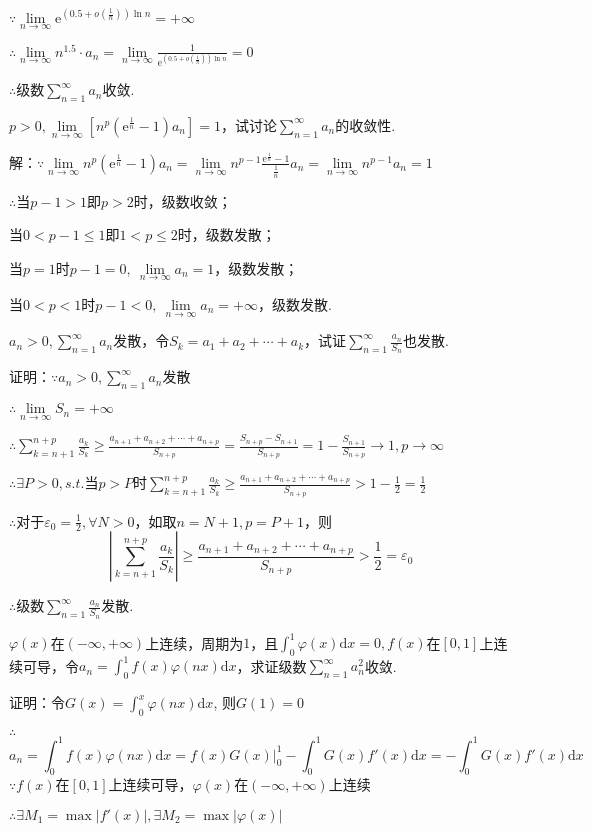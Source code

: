 \documentclass[12pt,UTF8]{ctexart}
\newcommand\Lim[0]{\lim\limits_{n\rightarrow\infty}}
\newcommand\Ser[1]{\sum_{n=#1}^\infty}
\newcommand{\varSer}[3]{\sum_{#1=#2}^{#3}}
\newcommand{\me}[0]{\mathrm e}
\begin{document}
\begin{enumerate}
$\because\Lim\me^{(0.5+o(\frac1{n}))\ln n}=+\infty$

$\therefore\Lim n^{1.5}\cdot a_n=\Lim\frac1{\me^{(0.5+o(\frac1{n}))\ln n}}=0$

$\therefore$级数$\Ser1{a_n}$收敛.

$p>0,\Lim[n^p(\mathrm e^{\frac1n}-1)a_n]=1$，试讨论$\Ser{1}a_n$的收敛性.

解：$\because\Lim n^p(\mathrm e^{\frac1n}-1)a_n=\Lim n^{p-1}\frac{\mathrm e^{\frac1n}-1}{\frac1n}a_n=\Lim n^{p-1}a_n=1$

$\therefore$当$p-1>1$即$p>2$时，级数收敛；

当$0<p-1\leq1$即$1<p\leq2$时，级数发散；

当$p=1$时$p-1=0,\ \Lim a_n=1$，级数发散；

当$0<p<1$时$p-1<0,\ \Lim a_n=+\infty$，级数发散.

$a_n>0,\Ser{1}a_n$发散，令$S_k=a_1+a_2+\cdots+a_k$，试证$\Ser{1}\frac{a_n}{S_n}$也发散.

证明：$\because a_n>0,\Ser{1}a_n$发散

$\therefore\Lim S_n=+\infty$

$\therefore\varSer k{n+1}{n+p}\frac{a_k}{S_k}\geq\frac{a_{n+1}+a_{n+2}+\cdots+a_{n+p}}{S_{n+p}}=\frac{S_{n+p}-S_{n+1}}{S_{n+p}}=1-\frac{S_{n+1}}{S_{n+p}}\rightarrow1,p\rightarrow\infty$

$\therefore\exists P>0,s.t.$当$p>P$时$\varSer k{n+1}{n+p}\frac{a_k}{S_k}\geq\frac{a_{n+1}+a_{n+2}+\cdots+a_{n+p}}{S_{n+p}}>1-\frac12=\frac12$

$\therefore$对于$\varepsilon_0=\frac12, \forall N>0$，如取$n=N+1,p=P+1$，则
\[|\varSer k{n+1}{n+p}\frac{a_k}{S_k}|\geq\frac{a_{n+1}+a_{n+2}+\cdots+a_{n+p}}{S_{n+p}}>\frac12=\varepsilon_0\]

$\therefore$级数$\Ser{1}\frac{a_n}{S_n}$发散.

$\varphi(x)$在$(-\infty,+\infty)$上连续，周期为$1$，且$\int_0^1\varphi(x)\mathrm dx=0,f(x)$在$[0,1]$上连续可导，令$a_n=\int_0^1f(x)\varphi(nx)\mathrm dx$，求证级数$\Ser{1}a_n^2$收敛.

证明：令$G(x)=\int_0^x\varphi(nx)\mathrm dx$, 则$G(1)=0$

$\therefore$
\[
a_n=\int_0^1f(x)\varphi(nx)\mathrm dx=f(x)G(x)\big|_0^1-\int_0^1G(x)f'(x)\mathrm dx=-\int_0^1G(x)f'(x)\mathrm dx
\]
$\because f(x)$在$[0,1]$上连续可导，$\varphi(x)$在$(-\infty,+\infty)$上连续

$\therefore\exists M_1=\max|f'(x)|,\exists M_2=\max|\varphi(x)|$


\end{enumerate}
\end{document}
